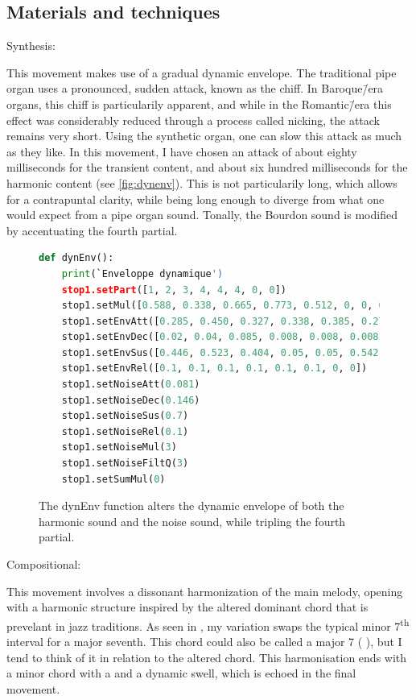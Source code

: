 \documentclass[12pt,twoside,maitrise]{dms_ks}
\theoremstyle{definition}
\begin{document}
{{\subsection{Materials and techniques}

Synthesis:

This movement makes use of a gradual dynamic envelope.
The traditional pipe organ uses a pronounced, sudden attack, known as the chiff.
In Baroque\=/era organs, this chiff is particularily apparent, and while in the Romantic\=/era this effect was considerably reduced through a process called nicking, the attack remains very short.
Using the synthetic organ, one can slow this attack as much as they like. 
In this movement, I have chosen an attack of about eighty milliseconds for the transient content, and about six hundred milliseconds for the harmonic content (see \cref{fig:dynenv}). This is not particularily long, which allows for a contrapuntal clarity, while being long enough to diverge from what one would expect from a pipe organ sound.
Tonally, the Bourdon sound is modified by accentuating the fourth partial.

\begin{figure}[H]
\begin{lstlisting}[language=Python]
def dynEnv():
    print(`Enveloppe dynamique')
    stop1.setPart([1, 2, 3, 4, 4, 4, 0, 0])
    stop1.setMul([0.588, 0.338, 0.665, 0.773, 0.512, 0, 0, 0])
    stop1.setEnvAtt([0.285, 0.450, 0.327, 0.338, 0.385, 0.277, 0, 0])
    stop1.setEnvDec([0.02, 0.04, 0.085, 0.008, 0.008, 0.008, 0, 0])
    stop1.setEnvSus([0.446, 0.523, 0.404, 0.05, 0.05, 0.542, 0, 0])
    stop1.setEnvRel([0.1, 0.1, 0.1, 0.1, 0.1, 0.1, 0, 0])
    stop1.setNoiseAtt(0.081)
    stop1.setNoiseDec(0.146)
    stop1.setNoiseSus(0.7)
    stop1.setNoiseRel(0.1)
    stop1.setNoiseMul(3)
    stop1.setNoiseFiltQ(3)
    stop1.setSumMul(0)
\end{lstlisting}
\caption{The dynEnv function alters the dynamic envelope of both the harmonic sound and the noise sound, while tripling the fourth partial.}
\label{fig:dynEnv}
\end{figure}

Compositional:

This movement involves a dissonant harmonization of the main melody, opening with a harmonic structure inspired by the altered dominant chord that is prevelant in jazz traditions.
As seen in , my variation swaps the typical minor 7\textsuperscript{th} interval for a major seventh.
This chord could also be called a major 7 ( ), but I tend to think of it in relation to the altered chord.
This harmonisation ends with a minor chord with a  and a dynamic swell, which is echoed in the final movement.

}}
\end{document}

